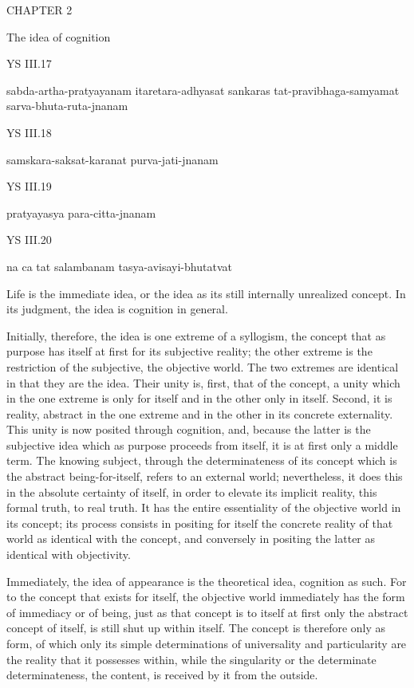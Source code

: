 CHAPTER 2

The idea of cognition

YS III.17

    sabda-artha-pratyayanam itaretara-adhyasat sankaras
    tat-pravibhaga-samyamat sarva-bhuta-ruta-jnanam

YS III.18

    samskara-saksat-karanat purva-jati-jnanam

YS III.19

    pratyayasya para-citta-jnanam

YS III.20

    na ca tat salambanam tasya-avisayi-bhutatvat

Life is the immediate idea, or the idea as
its still internally unrealized concept.
In its judgment, the idea is cognition in general.

Initially, therefore, the idea is one extreme of a syllogism,
the concept that as purpose has itself
at first for its subjective reality;
the other extreme is the restriction
of the subjective, the objective world.
The two extremes are identical in that they are the idea.
Their unity is, first, that of the concept,
a unity which in the one extreme is only for itself
and in the other only in itself.
Second, it is reality, abstract in the one extreme
and in the other in its concrete externality.
This unity is now posited through cognition,
and, because the latter is the subjective idea
which as purpose proceeds from itself,
it is at first only a middle term.
The knowing subject, through the
determinateness of its concept
which is the abstract being-for-itself,
refers to an external world;
nevertheless, it does this in
the absolute certainty of itself,
in order to elevate its implicit reality,
this formal truth, to real truth.
It has the entire essentiality of
the objective world in its concept;
its process consists in positing for itself
the concrete reality of that world
as identical with the concept,
and conversely in positing the latter
as identical with objectivity.

Immediately, the idea of appearance is
the theoretical idea, cognition as such.
For to the concept that exists for itself,
the objective world immediately has
the form of immediacy or of being,
just as that concept is to itself
at first only the abstract concept of itself,
is still shut up within itself.
The concept is therefore only as form,
of which only its simple determinations
of universality and particularity are
the reality that it possesses within,
while the singularity or the determinate determinateness,
the content, is received by it from the outside.


